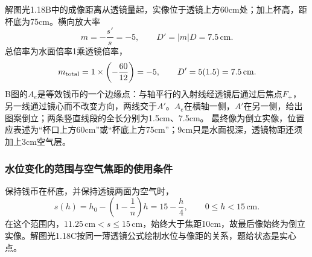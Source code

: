 \documentclass[UTF8,fontset=fandol,a4paper,11pt]{ctexart}
\begin{document}
解图光1.18B中的成像距离从透镜量起，实像位于透镜上方60cm处；加上杯高，距杯底为75cm。横向放大率
\[
m=-\frac{s'}s=-5,\qquad
\boxed{D'=|m|D=7.5\,\mathrm{cm}}.
\]
总倍率为水面倍率1乘透镜倍率，
\[
m_{\rm total}=1\times\left(-\frac{60}{12}\right)=-5,\qquad
D'=5(1.5)=7.5\,\mathrm{cm}.
\]
B图的$A_e$是等效钱币的一个边缘点：与轴平行的入射线经透镜后通过后焦点$F_+$，另一线通过镜心而不改变方向，两线交于$A'$。$A_e$在横轴一侧，$A'$在另一侧，给出图案倒立；两条竖直线段的全长分别为1.5cm、7.5cm。
最终像为倒立实像，位置应表述为“杯口上方60cm”或“杯底上方75cm”；9cm只是水面视深，透镜物距还须加上3cm空气层。
\subsubsection*{水位变化的范围与空气焦距的使用条件}
保持钱币在杯底，并保持透镜两面为空气时，
\[
s(h)=h_0-\left(1-\frac1n\right)h=15-\frac h4,
\qquad 0\le h<15\,\mathrm{cm}.
\]
在这个范围内，$11.25\,\mathrm{cm}<s\le15\,\mathrm{cm}$，始终大于焦距10cm，故最后像始终为倒立实像。解图光1.18C按同一薄透镜公式绘制水位与像距的关系，题给状态是实心点。
\end{document}

